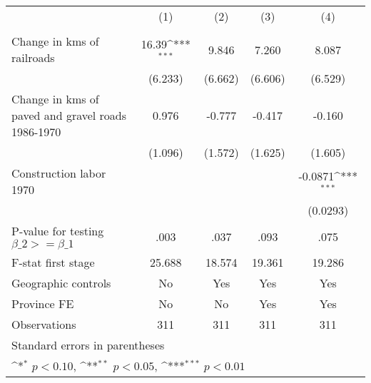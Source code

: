 {
\def\sym#1{\ifmmode^{#1}\else\(^{#1}\)\fi}
\begin{tabular}{l*{4}{c}}
\hline\hline
                &\multicolumn{1}{c}{(1)}&\multicolumn{1}{c}{(2)}&\multicolumn{1}{c}{(3)}&\multicolumn{1}{c}{(4)}\\
                &\multicolumn{1}{c}{}&\multicolumn{1}{c}{}&\multicolumn{1}{c}{}&\multicolumn{1}{c}{}\\
\hline
Change in kms of railroads&    16.39\sym{***}&    9.846         &    7.260         &    8.087         \\
                &  (6.233)         &  (6.662)         &  (6.606)         &  (6.529)         \\
[1em]
Change in kms of paved and gravel roads 1986-1970&    0.976         &   -0.777         &   -0.417         &   -0.160         \\
                &  (1.096)         &  (1.572)         &  (1.625)         &  (1.605)         \\
[1em]
Construction labor 1970&                  &                  &                  &  -0.0871\sym{***}\\
                &                  &                  &                  & (0.0293)         \\
\hline
P-value for testing $\beta\_{2} >= \beta\_{1}$&     .003         &     .037         &     .093         &     .075         \\
F-stat first stage&   25.688         &   18.574         &   19.361         &   19.286         \\
Geographic controls&       No         &      Yes         &      Yes         &      Yes         \\
Province FE     &       No         &       No         &      Yes         &      Yes         \\
Observations    &      311         &      311         &      311         &      311         \\
\hline\hline
\multicolumn{5}{l}{\footnotesize Standard errors in parentheses}\\
\multicolumn{5}{l}{\footnotesize \sym{*} \(p<0.10\), \sym{**} \(p<0.05\), \sym{***} \(p<0.01\)}\\
\end{tabular}
}
